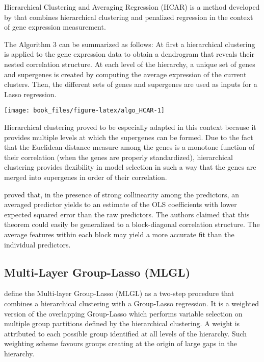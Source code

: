 \documentclass[]{book}
\begin{document}
Hierarchical Clustering and Averaging Regression (HCAR) is a method
developed by \citep{park_averaged_2007} that combines hierarchical clustering
and penalized regression in the context of gene expression measurement.

The Algorithm 3 can be summarized as follows: At first a
hierarchical clustering is applied to the gene expression data to obtain
a dendrogram that reveals their nested correlation structure. At each
level of the hierarchy, a unique set of genes and supergenes is created
by computing the average expression of the current clusters. Then, the
different sets of genes and supergenes are used as inputs for a Lasso
regression.

\begin{center}\texttt{[image: book\_files/figure-latex/algo\_HCAR-1]} \end{center}

Hierarchical clustering proved to be especially adapted in this context
because it provides multiple levels at which the supergenes can be
formed. Due to the fact that the Euclidean distance measure among the
genes is a monotone function of their correlation (when the genes are
properly standardized), hierarchical clustering provides flexibility in
model selection in such a way that the genes are merged into supergenes
in order of their correlation.

\citep{park_averaged_2007} proved that, in the presence of strong
collinearity among the predictors, an averaged predictor yields to an
estimate of the OLS coefficients with lower expected squared error than
the raw predictors. The authors claimed that this theorem could easily
be generalized to a block-diagonal correlation structure. The average
features within each block may yield a more accurate fit than the
individual predictors.

\hypertarget{MLGL}{%
\subsection{Multi-Layer Group-Lasso (MLGL)}\label{MLGL}}

\citep{grimonprez_selection_2016} define the Multi-layer Group-Lasso (MLGL)
as a two-step procedure that combines a hierarchical clustering with a
Group-Lasso regression. It is a weighted version of the overlapping
Group-Lasso \citep{jacob2009group} which performs variable selection on
multiple group partitions defined by the hierarchical clustering. A
weight is attributed to each possible group identified at all levels of
the hierarchy. Such weighting scheme favours groups creating at the
origin of large gaps in the hierarchy.
\end{document}
